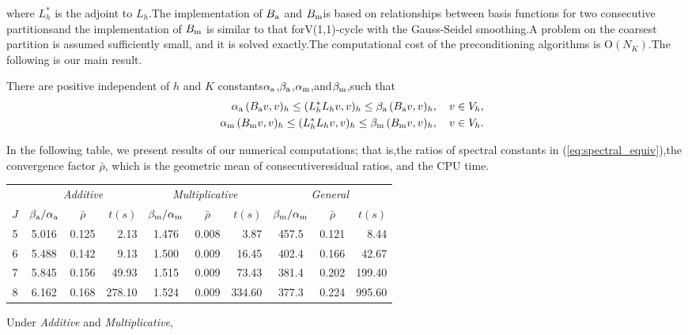 \documentclass{report}
\begin{document}
where $L_h^*$ is the adjoint to $L_h$.The implementation of $B_{\textup{\scriptsize a}}$ and $B_{\textup{\scriptsize m}}$is based on relationships between basis functions for two consecutive partitionsand the implementation of $B_{\textup{\scriptsize m}}$ is similar to that forV(1,1)-cycle with the Gauss-Seidel smoothing.A problem on the coarsest partition is assumed sufficiently small,
and it is solved exactly.The computational cost of the preconditioning algorithms is $\mbox{O}(N_K)$.The following is our main result.\begin{theorem}There are positive independent of $h$ and $K$ constants$\alpha_{\textup{\scriptsize a}}$,$\beta_{\textup{\scriptsize a}}$,$\alpha_{\textup{\scriptsize m}}$,and$\beta_{\textup{\scriptsize m}}$,such that\begin{eqnarray}\label{eq:spectral_equiv}&&\alpha_{\textup{\scriptsize a}}\,
(B_{\textup{\scriptsize a}}v,v)_h\leq (L_h^*L_hv,v)_h \leq\beta_{\textup{\scriptsize a}}\,
(B_{\textup{\scriptsize a}}v,v)_h,\quad v\in V_h,\\\nonumber&&\alpha_{\textup{\scriptsize m}}\,
(B_{\textup{\scriptsize m}}v,v)_h\leq (L_h^*L_hv,v)_h \leq\beta_{\textup{\scriptsize m}}\,
(B_{\textup{\scriptsize m}}v,v)_h,\quad v\in V_h.\end{eqnarray}\end{theorem}In the following table,
we present results of our numerical computations;
that is,the ratios of spectral constants in (\ref{eq:spectral_equiv}),the convergence factor $\bar{\rho}$,
which is the geometric mean of consecutiveresidual ratios,
and the CPU time.\begin{center}\begin{tabular}{c|ccr|ccr|ccr}
& \multicolumn{3}{c|}{\textit{Additive}}
& \multicolumn{3}{c|}{\textit{Multiplicative}}&\multicolumn{3}{c}{\textit{General}}\\\cline{2-10}$J$
& $\beta_{\textrm{\scriptsize a}}/\alpha_{\textrm{\scriptsize a}}$
& $\bar{\rho}$
& $t(s)$
& $\beta_{\textrm{\scriptsize m}}/\alpha_{\textrm{\scriptsize m}}$
& $\bar{\rho}$
& $t(s)$
& $\beta_{\textrm{\scriptsize m}}/\alpha_{\textrm{\scriptsize m}}$
& $\bar{\rho}$
& $t(s)$\\\hline5
& 5.016
& 0.125
& 2.13
& 1.476
& 0.008
& 3.87
& 457.5
& 0.121
& 8.44\\6
& 5.488
& 0.142
& 9.13
& 1.500
& 0.009
& 16.45
& 402.4
& 0.166
& 42.67\\7
& 5.845
& 0.156
& 49.93
& 1.515
& 0.009
& 73.43
& 381.4
& 0.202
& 199.40\\8
& 6.162
& 0.168
& 278.10
& 1.524
& 0.009
& 334.60
& 377.3
& 0.224
& 995.60\end{tabular}\end{center}Under \textit{Additive} and \textit{Multiplicative},
\end{document}
